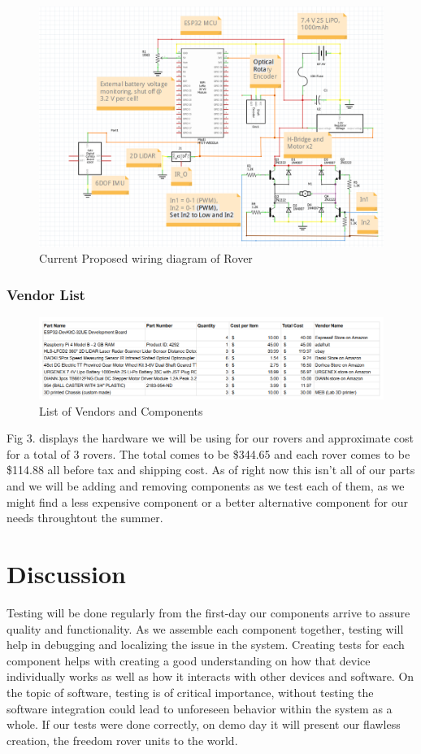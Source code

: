 \documentclass[conference]{IEEEtran}
\begin{document}
\begin{figure}[H]
	\includegraphics[width=\linewidth]{RoverWiringSchematic.png}
	\caption{Current Proposed wiring diagram of Rover}
\end{figure}

\subsubsection{Vendor List}
\begin{figure}[!h]
	\includegraphics[width=\linewidth]{Vendors.png}
	\caption{List of Vendors and Components}
\end{figure}

Fig 3. displays the hardware we will be using for our rovers and approximate cost for a total of 3 rovers. The total comes to be \$344.65 and each rover comes to be \$114.88 all before tax and shipping cost. As of right now this isn't all of our parts and we will be adding and removing components as we test each of them, as we might find a less expensive component or a better alternative component for our needs throughtout the summer.

\section{Discussion}
Testing will be done regularly from the first-day our components arrive to assure quality and functionality. As we assemble each component together, testing will help in debugging and localizing the issue in the system. Creating tests for each component helps with creating a good understanding on how that device individually works as well as how it interacts with other devices and software. On the topic of software, testing is of critical importance, without testing the software integration could lead to unforeseen behavior within the system as a whole. If our tests were done correctly, on demo day it will present our flawless creation, the freedom rover units to the world.
\end{document}

